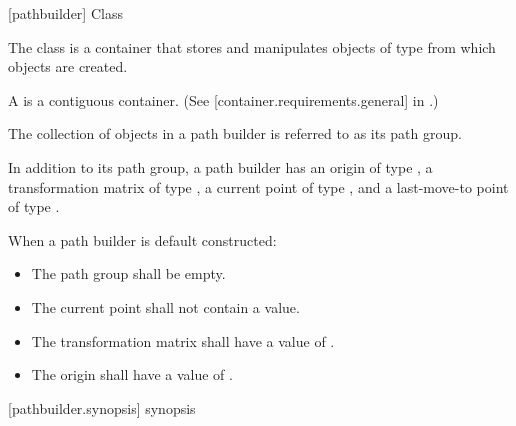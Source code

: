  [pathbuilder] {Class }

\pnum
{}
The class  is a container that stores and manipulates objects of type  from which  objects are created.

\pnum
A  is a contiguous container. (See [container.requirements.general] in \cppseventeen.)

\pnum
The collection of  objects in a path builder is referred to as its path group.

\pnum
In addition to its path group, a path builder has an origin of type , a transformation matrix of type , a current point of type , and a last-move-to point of type .

\pnum
When a path builder is default constructed:

\begin{itemize}
\item The path group shall be empty.
\item The current point shall not contain a value.
\item The transformation matrix shall have a value of .
\item The origin shall have a value of .
\end{itemize}

 [pathbuilder.synopsis] { synopsis}

